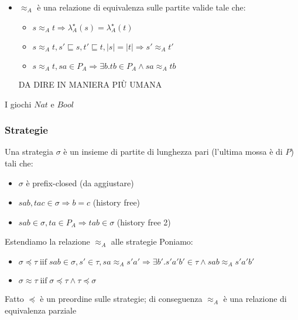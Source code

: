 \documentclass{beamer}
\begin{document}
\begin{frame}
	
	\begin{itemize}
	\item $\approx_A$ è una relazione di equivalenza sulle partite valide tale che:
		\begin{itemize}
		\item $s\approx_A t \Rightarrow \lambda^\star _A (s) = \lambda^\star _A (t) $
		\item $s\approx_A t , s' \sqsubseteq s , t' \sqsubseteq t, |s| = |t| \Rightarrow s' \approx_A t'$
		\item $s\approx_A t , sa\in P_A \Rightarrow \exists b . tb \in P_A \wedge sa \approx_A tb$
		\end{itemize}
	DA DIRE IN MANIERA PIÙ UMANA
	\end{itemize}
	
	\begin{example}
		I giochi $Nat$ e $Bool$
	\end{example}	
	
\end{frame}

\begin{frame}

	\frametitle{Strategie}
	
	Una strategia $\sigma$ è un insieme di partite di lunghezza pari (l'ultima mossa è di $P$) tali che:
	\begin{itemize}
	\item $\sigma$ è prefix-closed (da aggiustare)
	\item $sab , tac \in \sigma \Rightarrow b=c$ (history free)
	\item $sab\in \sigma, ta\in P_A \Rightarrow tab\in \sigma$ (history free 2)
	\end{itemize}
	
	Estendiamo la relazione $\approx_A$ alle strategie
	Poniamo:
	\begin{itemize}
	\item $\sigma \preccurlyeq \tau \; \text{iif} \; sab\in \sigma , s' \in \tau , sa \approx_A s'a' \Rightarrow \exists b' . s'a'b' \in \tau \wedge sab \approx_A s'a'b'$
	\item $\sigma \approx \tau \; \text{iif} \; \sigma \preccurlyeq \tau \wedge \tau \preccurlyeq \sigma$
	\end{itemize}

	\begin{block}{Fatto}
		$\preccurlyeq$ è un preordine sulle strategie; di conseguenza $\approx_A$ è una relazione di equivalenza parziale
	\end{block}
	
\end{frame}
\end{document}
